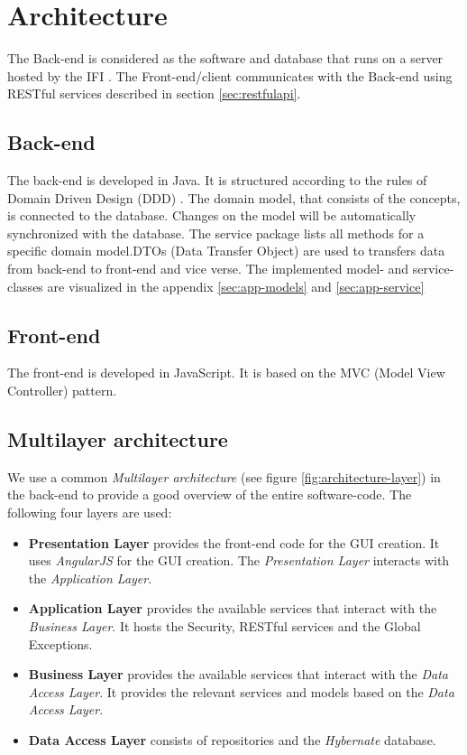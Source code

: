 \section{Architecture}

The Back-end is considered as the software and database that runs on a server hosted by the IFI \cite{ifi}. The Front-end/client communicates with the Back-end using RESTful services described in section \ref{sec:restfulapi}.\newline

\subsection{Back-end}
The back-end is developed in Java. It is structured according to the rules of Domain Driven Design (DDD) \cite{ddd}. The domain model, that consists of the concepts, is connected to the database. Changes on the model will be automatically synchronized with the database. The service package lists all methods for a specific domain model.\newline DTOs (Data Transfer Object) are used to transfers data from back-end to front-end and vice verse. \newline The implemented model- and service-classes are visualized in the appendix \ref{sec:app-models} and \ref{sec:app-service}  

\subsection{Front-end}
The front-end is developed in JavaScript. It is based on the MVC (Model View Controller) pattern.   

\subsection{Multilayer architecture}
We use a common \textit{Multilayer architecture} (see figure \ref{fig:architecture-layer}) in the back-end to provide a good overview of the entire software-code. The following four layers are used:
\begin{itemize}
    \item \textbf{Presentation Layer} provides the front-end code for the GUI creation. It uses \textit{AngularJS} for the GUI creation. The \textit{Presentation Layer} interacts with the \textit{Application Layer}.
    \item \textbf{Application Layer} provides the available services that interact with the \textit{Business Layer}. It hosts the Security, RESTful services and the Global Exceptions.
    \item \textbf{Business Layer} provides the available services that interact with the \textit{Data Access Layer}. It provides the relevant services and models based on the \textit{Data Access Layer}.
    \item \textbf{Data Access Layer} consists of repositories and the \textit{Hybernate} database. 
\end{itemize}

